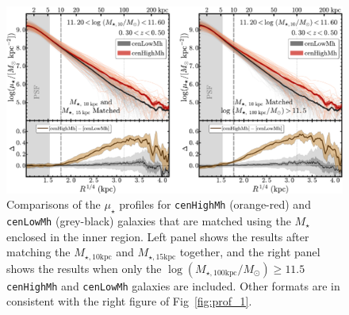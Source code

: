 \documentclass{emulateapj}
\def\rbcg{\texttt{cenHighMh}}
\def\nbcg{\texttt{cenLowMh}}
\def\mstar{{$M_{\star}$}}
\def\minn{{$M_{\star,10\mathrm{kpc}}$}}
\def\meff{{$M_{\star,15\mathrm{kpc}}$}}
\def\logmtot{{$\log (M_{\star,100\mathrm{kpc}}/M_{\odot})$}}
\def\mden{{$\mu_{\star}$}}
\begin{document}
\begin{CJK*}{UTF8}{gbsn}
  \begin{figure}[t!]
      \centering 
      \includegraphics[width=\textwidth]{fig/redbcg_prof_4}
      \caption{
          Comparisons of the \mden{} profiles for \rbcg{} (orange-red) and \nbcg{} 
          (grey-black) galaxies that are matched using the \mstar{} enclosed in the 
          inner region. 
          Left panel shows the results after matching the \minn{} and \meff{} together, 
          and the right panel shows the results when only the \logmtot{}$\ge 11.5$
          \rbcg{} and \nbcg{} galaxies are included.
          Other formats are in consistent with the right figure of Fig~\ref{fig:prof_1}.
          }
      \label{fig:prof_4} 
  \end{figure}
     
\clearpage


\end{CJK*}

\clearpage 

\label{lastpage}
\end{document}
